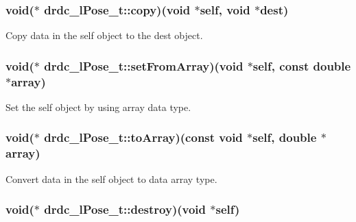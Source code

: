 \hypertarget{structdrdc__lPose__t_c9cc04bfd0d80d10a4edcf25686fc4e3}{
\subsubsection[copy]{\setlength{\rightskip}{0pt plus 5cm}void($\ast$ {\bf drdc\_\-lPose\_\-t::copy})(void $\ast$self, void $\ast$dest)}}
\label{structdrdc__lPose__t_c9cc04bfd0d80d10a4edcf25686fc4e3}


Copy data in the self object to the dest object. 

\hypertarget{structdrdc__lPose__t_c57df145bf3c3822128fe37bc1e530c6}{
\subsubsection[setFromArray]{\setlength{\rightskip}{0pt plus 5cm}void($\ast$ {\bf drdc\_\-lPose\_\-t::setFromArray})(void $\ast$self, const double $\ast$array)}}
\label{structdrdc__lPose__t_c57df145bf3c3822128fe37bc1e530c6}


Set the self object by using array data type. 

\hypertarget{structdrdc__lPose__t_896a70046179976efa52362a59ce54d2}{
\subsubsection[toArray]{\setlength{\rightskip}{0pt plus 5cm}void($\ast$ {\bf drdc\_\-lPose\_\-t::toArray})(const void $\ast$self, double $\ast$array)}}
\label{structdrdc__lPose__t_896a70046179976efa52362a59ce54d2}


Convert data in the self object to data array type. 

\hypertarget{structdrdc__lPose__t_d9c56a71e8224d85bedbdbc468f73962}{
\subsubsection[destroy]{\setlength{\rightskip}{0pt plus 5cm}void($\ast$ {\bf drdc\_\-lPose\_\-t::destroy})(void $\ast$self)}}
\label{structdrdc__lPose__t_d9c56a71e8224d85bedbdbc468f73962}


